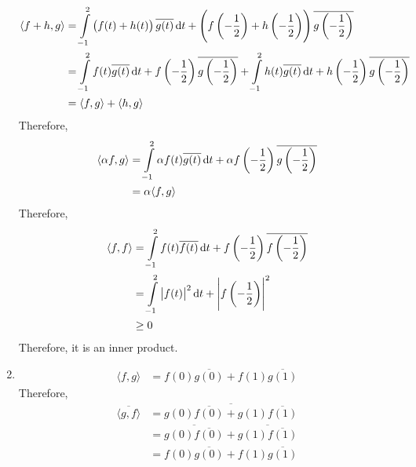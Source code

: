 \documentclass[fleqn, a4paper, 11pt, oneside]{amsart}
\theoremstyle{definition}
\theoremstyle{theorem}
\begin{document}
\begin{solution}
\begin{enumerate}
\begin{align*}
				\langle f + h , g \rangle & = \int\limits_{-1}^{2} \left( f(t) + h(t) \right) \overline{g(t)} \dif t + \left( f\left( -\frac{1}{2} \right) + h\left( -\frac{1}{2} \right) \right) \overline{g\left( -\frac{1}{2} \right)}                                                       \\
                                                          & = \int\limits_{-1}^{2} f(t) \overline{g(t)} \dif t + f\left( -\frac{1}{2} \right) \overline{g\left( -\frac{1}{2} \right)} + \int\limits_{-1}^{2} h(t) \overline{g(t)} \dif t + h\left( -\frac{1}{2} \right) \overline{g\left( -\frac{1}{2} \right)} \\
                                                          & = \langle f,g \rangle + \langle h,g \rangle
			\end{align*}
			Therefore,
			\begin{align*}
				\langle \alpha f , g \rangle & = \int\limits_{-1}^{2} \alpha f(t) \overline{g(t)} \dif t + \alpha f\left( -\frac{1}{2} \right) \overline{g\left( -\frac{1}{2} \right)} \\
                                                             & = \alpha \langle f,g \rangle
			\end{align*}
			Therefore,
			\begin{align*}
				\langle f,f \rangle & = \int\limits_{-1}^{2} f(t) \overline{f(t)} \dif t + f\left( -\frac{1}{2} \right) \overline{f\left( -\frac{1}{2} \right)} \\
                                                    & = \int\limits_{-1}^{2} \left| f(t) \right|^2 \dif t + \left| f\left( -\frac{1}{2} \right) \right|^2                       \\
                                                    & \ge 0
			\end{align*}
			Therefore, it is an inner product.
		\item
			\begin{align*}
				\langle f,g \rangle & = f(0) \overline{g(0)} + f(1) \overline{g(1)}
			\end{align*}
			Therefore,
			\begin{align*}
				\overline{\langle g,f \rangle} & = \overline{g(0) \overline{f(0)} + g(1) \overline{f(1)}}            \\
                                                               & = \overline{g(0) \overline{f(0)}} + \overline{g(1) \overline{f(1)}} \\
                                                               & = f(0) \overline{g(0)} + f(1) \overline{g(1)}                       \\

\end{align*}
\end{enumerate}
\end{solution}
\end{document}
